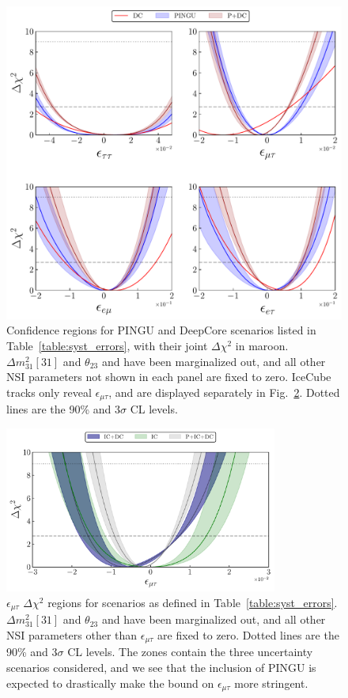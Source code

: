 \documentclass{article}
\newcommand{\emt}{\ensuremath{\epsilon_{\mu\tau}}}
\newcommand{\dm}{\Delta m^2_{31}}
\begin{document}
{\begin{figure}
    \begin{center}
       \includegraphics[scale = 0.7]{figures/joint_3D_NO.pdf}
       \caption{Confidence regions for PINGU and DeepCore scenarios listed in Table~\ref{table:syst_errors}, with their joint $\Delta \chi^2$ in maroon. $\dm[31]$ and $\theta_{23}$ and have been marginalized out, and all other NSI 
       parameters not shown in each panel are fixed to zero. 
       IceCube tracks only reveal $\emt$, and are displayed separately in Fig.~\ref{fig:IC_3D}. Dotted lines are the 90\% and $3\sigma$ CL levels.}\label{fig:3D_NO}
    \end{center}
 \end{figure} 
 \begin{figure}
    \begin{center} 
       \includegraphics[width=0.8\textwidth]{figures/PID_3D_emt.pdf}
       \caption{$\emt$ $\Delta \chi^2$ regions for scenarios as defined in Table~\ref{table:syst_errors}.
     $\dm[31]$ and $\theta_{23}$ and have been marginalized out, and all other NSI 
     parameters other than $\emt$ are fixed to zero. Dotted lines are the 90\% and $3\sigma$ CL levels.
     The zones contain the three uncertainty scenarios considered, and we see that the inclusion of PINGU is expected 
     to drastically make the bound on $\emt$ more stringent.
     }\label{fig:IC_3D}
    \end{center}
 \end{figure}
 
}
\end{document}

